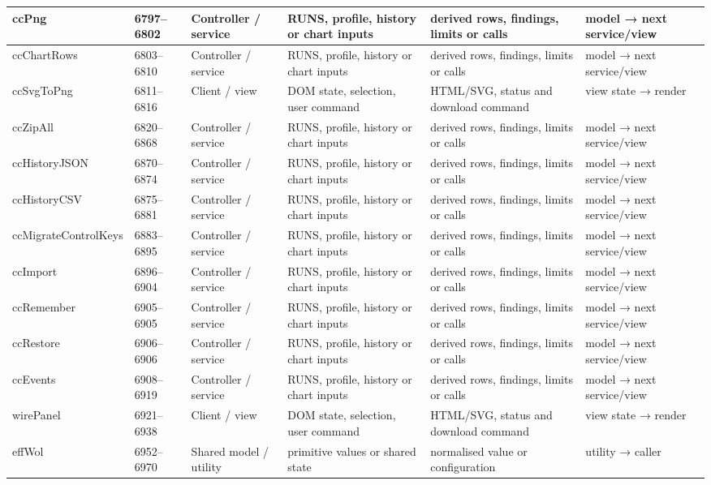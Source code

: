 \begin{landscape}
\begin{longtable}{@{}p{3.2cm}p{1.45cm}p{2.7cm}p{4.0cm}p{4.0cm}p{3.0cm}@{}}
ccPng & 6797--6802 & Controller / service & RUNS, profile, history or chart inputs & derived rows, findings, limits or calls & model → next service/view \\\hline
ccChartRows & 6803--6810 & Controller / service & RUNS, profile, history or chart inputs & derived rows, findings, limits or calls & model → next service/view \\\hline
ccSvgToPng & 6811--6816 & Client / view & DOM state, selection, user command & HTML/SVG, status and download command & view state → render \\\hline
ccZipAll & 6820--6868 & Controller / service & RUNS, profile, history or chart inputs & derived rows, findings, limits or calls & model → next service/view \\\hline
ccHistoryJSON & 6870--6874 & Controller / service & RUNS, profile, history or chart inputs & derived rows, findings, limits or calls & model → next service/view \\\hline
ccHistoryCSV & 6875--6881 & Controller / service & RUNS, profile, history or chart inputs & derived rows, findings, limits or calls & model → next service/view \\\hline
ccMigrateControlKeys & 6883--6895 & Controller / service & RUNS, profile, history or chart inputs & derived rows, findings, limits or calls & model → next service/view \\\hline
ccImport & 6896--6904 & Controller / service & RUNS, profile, history or chart inputs & derived rows, findings, limits or calls & model → next service/view \\\hline
ccRemember & 6905--6905 & Controller / service & RUNS, profile, history or chart inputs & derived rows, findings, limits or calls & model → next service/view \\\hline
ccRestore & 6906--6906 & Controller / service & RUNS, profile, history or chart inputs & derived rows, findings, limits or calls & model → next service/view \\\hline
ccEvents & 6908--6919 & Controller / service & RUNS, profile, history or chart inputs & derived rows, findings, limits or calls & model → next service/view \\\hline
wirePanel & 6921--6938 & Client / view & DOM state, selection, user command & HTML/SVG, status and download command & view state → render \\\hline
effWol & 6952--6970 & Shared model / utility & primitive values or shared state & normalised value or configuration & utility → caller \\\hline

\end{longtable}
\end{landscape}
